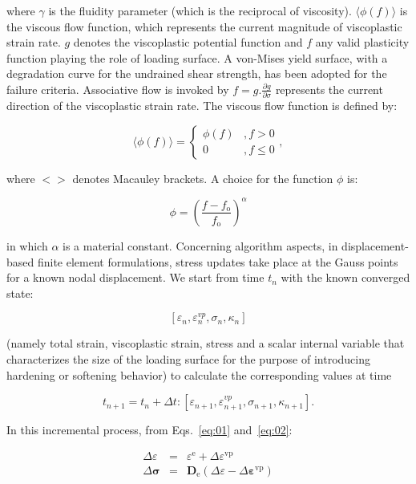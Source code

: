 \documentclass[applsci,journal,article,submit,moreauthors,pdftex]{Definitions/mdpi}
\begin{document}
where $\gamma$ is the fluidity parameter (which is the reciprocal of viscosity). $\langle\phi(f)\rangle$ is the viscous flow function, which represents the current magnitude of viscoplastic strain rate. $g$ denotes the viscoplastic potential function and $f$ any valid plasticity function playing the role of loading surface. A von-Mises yield surface, with a degradation curve for the undrained shear strength, has been adopted for the failure criteria. Associative flow is invoked by $f=g . \frac{\partial g}{\partial \sigma}$ represents the current direction of the viscoplastic strain rate. The viscous flow function is defined by:

\begin{equation}
\langle\phi(f)\rangle=\left\{\begin{array}{cl}\phi(f) & , f>0 \\ 0 & , f \leq 0\end{array}\right. ,
\end{equation}

where $<>$ denotes Macauley brackets. A choice for the function $\phi$ is:

\begin{equation}
\phi=\left(\frac{f-f_{\mathrm{o}}}{f_{\mathrm{o}}}\right)^{\alpha}
\end{equation}

in which $\alpha$ is a material constant. Concerning algorithm aspects, in displacement-based finite element formulations, stress updates take place at the Gauss points for a known nodal displacement. We start from time $t_{n}$ with the known converged state: 

\begin{equation}
\left[\varepsilon_{n}, \varepsilon_{n}^{v p}, \sigma_{n}, \kappa_{n}\right]
\end{equation}

(namely total strain, viscoplastic strain, stress and a scalar internal variable that characterizes the size of the loading surface for the purpose of introducing hardening or softening behavior) to calculate the corresponding values at time 

\begin{equation}
t_{n+1}=t_{n}+\Delta t:\left[\varepsilon_{n+1}, \varepsilon_{n+1}^{v p}, \sigma_{n+1}, \kappa_{n+1}\right].
\end{equation}

In this incremental process, from Eqs.~\ref{eq:01} and~\ref{eq:02}:

\begin{eqnarray}
\Delta \varepsilon &=& \varepsilon^{\mathrm{e}}+\Delta \varepsilon^{\mathrm{vp}} \\
\Delta \boldsymbol{\sigma} &=& \mathbf{D}_{\mathrm{e}}\left(\Delta \varepsilon-\Delta \boldsymbol{\varepsilon}^{\mathrm{vp}}\right)
\end{eqnarray}
\end{document}

